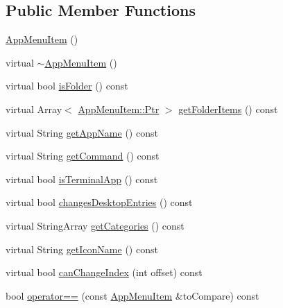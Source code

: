 \subsection*{Public Member Functions}
\begin{DoxyCompactItemize}
\item 
\mbox{\hyperlink{classAppMenuItem_a5762f4a6394da50af01ec644cb71bd21}{App\+Menu\+Item}} ()
\item 
virtual \mbox{\hyperlink{classAppMenuItem_a1f1e4cbbec28a4564053efce890e95cd}{$\sim$\+App\+Menu\+Item}} ()
\item 
virtual bool \mbox{\hyperlink{classAppMenuItem_a8246d80e6cec284fa67a69eb8fa12354}{is\+Folder}} () const
\item 
virtual Array$<$ \mbox{\hyperlink{classAppMenuItem_ab5f51c5d74f8df62b8862c0cc8126cb7}{App\+Menu\+Item\+::\+Ptr}} $>$ \mbox{\hyperlink{classAppMenuItem_a3a9b2ec87af0c063a892753bd64e944a}{get\+Folder\+Items}} () const
\item 
virtual String \mbox{\hyperlink{classAppMenuItem_aef18401da6511ac234ccbb2d2131fcad}{get\+App\+Name}} () const
\item 
virtual String \mbox{\hyperlink{classAppMenuItem_ab56357ca864c4cedc9caed1118498670}{get\+Command}} () const
\item 
virtual bool \mbox{\hyperlink{classAppMenuItem_ac8e0c435f1e5dcf67dff223d819f6a2d}{is\+Terminal\+App}} () const
\item 
virtual bool \mbox{\hyperlink{classAppMenuItem_a692765630ee15b4acdedc62d2d2e15d8}{changes\+Desktop\+Entries}} () const
\item 
virtual String\+Array \mbox{\hyperlink{classAppMenuItem_a4d944a13d50b5156d77d0d735c7a0a90}{get\+Categories}} () const
\item 
virtual String \mbox{\hyperlink{classAppMenuItem_a7c5b3d84b4fa24009e0618e0e3cd804e}{get\+Icon\+Name}} () const
\item 
virtual bool \mbox{\hyperlink{classAppMenuItem_a62de7cea03d96eecba40a533fdac6477}{can\+Change\+Index}} (int offset) const
\item 
bool \mbox{\hyperlink{classAppMenuItem_a06c07fe9236590e173fdb6d51c3a3ff7}{operator==}} (const \mbox{\hyperlink{classAppMenuItem}{App\+Menu\+Item}} \&to\+Compare) const
\end{DoxyCompactItemize}
